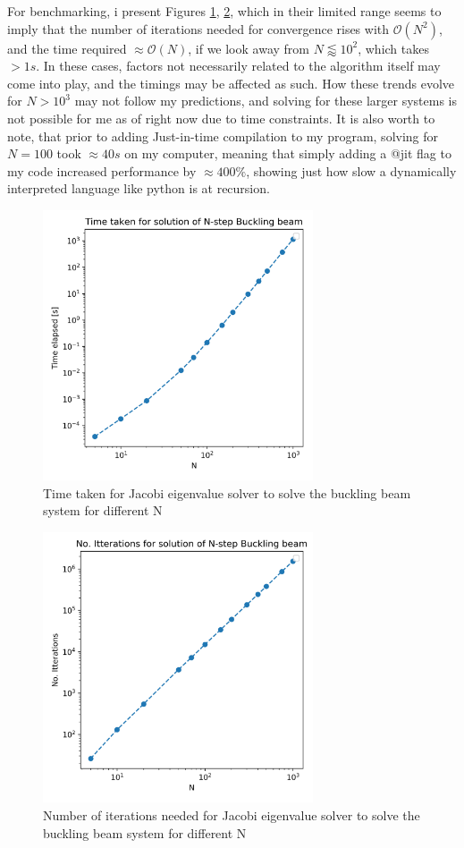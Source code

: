 \documentclass[10pt,showpacs,preprintnumbers,footinbib,amsmath,amssymb,aps,prl,twocolumn,groupedaddress,superscriptaddress,showkeys]{revtex4-1}
\begin{document}
  For benchmarking, i present Figures \ref{fig:time}, \ref{fig:count}, which in their limited range seems to imply that the number of iterations needed for convergence rises with $\mathcal O(N^2)$, and the time required $\approx \mathcal O(N)$, if we look away from $N\lessapprox 10^2$, which takes $>1s$. In these cases, factors not necessarily related to the algorithm itself may come into play, and the timings may be affected as such. How these trends evolve for $N>10^3$ may not follow my predictions, and solving for these larger systems is not possible for me as of right now due to time constraints. It is also worth to note, that prior to adding Just-in-time compilation to my program, solving for $N=100$ took $\approx 40s$ on my computer, meaning that simply adding a @jit flag to my code increased performance by $\approx 400\%$, showing just how slow a dynamically interpreted language like python is at recursion.

  \begin{figure}[h!]
    \center
    \includegraphics[width=8cm]{figs/q2c_timeloglog.png}
    \caption{Time taken for Jacobi eigenvalue solver to solve the buckling beam system for different N}
    \label{fig:time}
  \end{figure}

  \begin{figure}[h!]
    \center
    \includegraphics[width=8cm]{figs/q2c_countloglog.png}
    \caption{Number of iterations needed for Jacobi eigenvalue solver to solve the buckling beam system for different N}
    \label{fig:count}
  \end{figure}
\end{document}
